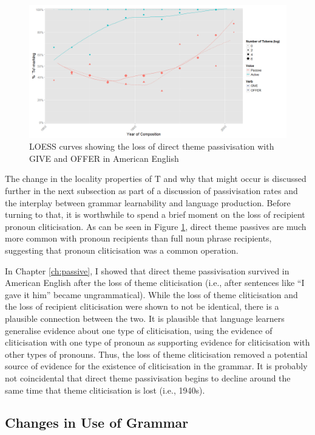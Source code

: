 	\begin{figure}[ht!]
		\includegraphics[width=\linewidth]{../images/recpro_to_am}
		\caption{LOESS curves showing the loss of direct theme passivisation with GIVE and OFFER in American English}
		\label{fig:loss-of-dt-in-amen}
	\end{figure}

	The change in the locality properties of T and why that might occur is discussed further in the next subsection as part of a discussion of passivisation rates and the interplay between grammar learnability and language production. Before turning to that, it is worthwhile to spend a brief moment on the loss of recipient pronoun cliticisation. As can be seen in Figure \ref{fig:loss-of-dt-in-amen}, direct theme passives are much more common with pronoun recipients than full noun phrase recipients, suggesting that pronoun cliticisation was a common operation. 
	
	In Chapter \ref{ch:passive}, I showed that direct theme passivisation survived in American English after the loss of theme cliticisation (i.e., after sentences like ``I gave it him'' became ungrammatical). While the loss of theme cliticisation and the loss of recipient cliticisation were shown to not be identical, there is a plausible connection between the two. It is plausible that language learners generalise evidence about one type of cliticisation, using the evidence of cliticisation with one type of pronoun as supporting evidence for cliticisation with other types of pronouns. Thus, the loss of theme cliticisation removed a potential source of evidence for the existence of cliticisation in the grammar. It is probably not coincidental that direct theme passivisation begins to decline around the same time that theme cliticisation is lost (i.e., 1940s).

	\subsection{Changes in Use of Grammar}

